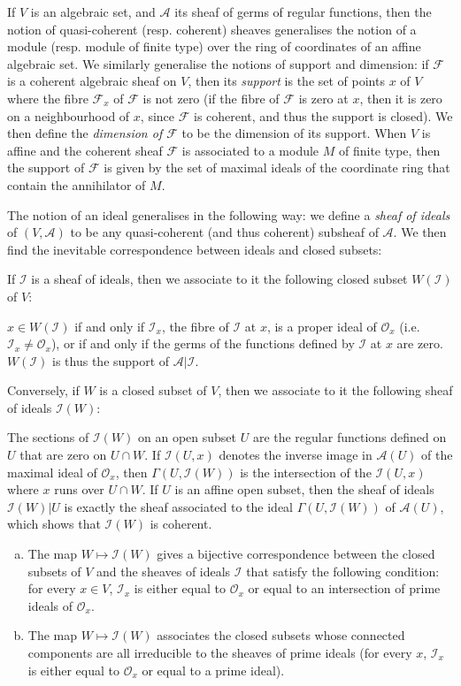 \documentclass{article}
\theoremstyle{plain}
\newenvironment{proposition}[1]
    {\renewcommand\theinnercustomproposition{#1}\innercustomproposition}
    {\endinnercustomproposition}
\theoremstyle{definition}
\newcommand{\sh}{\mathscr}
\newcommand{\oldpage}[1]{\marginpar{\footnotesize$\Big\vert$ \textit{p.~#1}}}
\begin{document}
If $V$ is an algebraic set, and $\sh{A}$ its sheaf of germs of regular functions, then the notion of quasi-coherent (resp. coherent) sheaves generalises the notion of a module (resp. module of finite type) over the ring of coordinates of an affine algebraic set.
We similarly generalise the notions of support and dimension: if $\sh{F}$ is a coherent algebraic sheaf on $V$, then its \emph{support} is the set of points $x$ of $V$ where the fibre $\sh{F}_x$ of $\sh{F}$ is not zero (if the fibre of $\sh{F}$ is zero at $x$, then it is zero on a neighbourhood of $x$, since $\sh{F}$ is coherent, and thus the support is closed).
We then define the \emph{dimension of $\sh{F}$} to be the dimension of its support.
When $V$ is affine and the coherent sheaf $\sh{F}$ is associated to a module $M$ of finite type, then the support of $\sh{F}$ is given by the set of maximal ideals of the coordinate ring that contain the annihilator of $M$.

The notion of an ideal generalises in the following way: we define a \emph{sheaf of ideals} of $(V,\sh{A})$ to be any quasi-coherent (and thus coherent) subsheaf of $\sh{A}$.
We then find the inevitable correspondence between ideals and closed subsets:

If $\sh{I}$ is a sheaf of ideals, then we associate to it the following closed subset $W(\sh{I})$ of $V$:

$x\in W(\sh{I})$ if and only if $\sh{I}_x$, the fibre of $\sh{I}$ at $x$, is a proper ideal of $\sh{O}_x$ (i.e. $\sh{I}_x\neq\sh{O}_x$), or if and only if the germs of the functions defined by $\sh{I}$ at $x$ are zero.
$W(\sh{I})$ is thus the support of $\sh{A}|\sh{I}$.

Conversely, if $W$ is a closed subset of $V$, then we associate to it the following sheaf of ideals $\sh{I}(W)$:

The sections of $\sh{I}(W)$ on an open subset $U$ are the regular functions defined on $U$ that are zero on $U\cap W$.
If $\sh{I}(U,x)$ denotes the inverse image in $\sh{A}(U)$ of the maximal ideal of $\sh{O}_x$, then $\Gamma(U,\sh{I}(W))$ is the intersection
\oldpage{2-03}
of the $\sh{I}(U,x)$ where $x$ runs over $U\cap W$.
If $U$ is an affine open subset, then the sheaf of ideals $\sh{I}(W)|U$ is exactly the sheaf associated to the ideal $\Gamma(U,\sh{I}(W))$ of $\sh{A}(U)$, which shows that $\sh{I}(W)$ is coherent.

\begin{proposition}{1}
\label{proposition1}
  \begin{enumerate}[(a)]
    \item The map $W\mapsto\sh{I}(W)$ gives a bijective correspondence between the closed subsets of $V$ and the sheaves of ideals $\sh{I}$ that satisfy the following condition:
      for every $x\in V$, $\sh{I}_x$ is either equal to $\sh{O}_x$ or equal to an intersection of prime ideals of $\sh{O}_x$.
    \item The map $W\mapsto\sh{I}(W)$ associates the closed subsets whose connected components are all irreducible to the sheaves of prime ideals (for every $x$, $\sh{I}_x$ is either equal to $\sh{O}_x$ or equal to a prime ideal).
  \end{enumerate}
\end{proposition}
\end{document}
